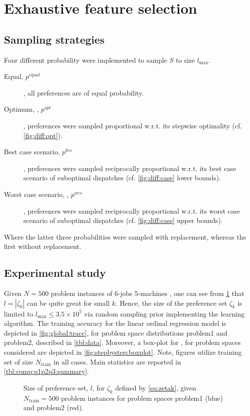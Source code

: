 \section{Exhaustive feature selection}

\subsection{Sampling strategies}
Four different probability were implemented to sample $S$ to size $l_{\max}$. 
\begin{description}
	\item[Equal, $p^{equal}$], all preferences are of equal probability.
	\item[Optimum, , $p^{opt}$], preferences were sampled proportional w.r.t. its stepwise optimality (cf. \cref{fig:diff:opt}).
	\item[Best case scenario, $p^{bcs}$], preferences were sampled reciprocally proportional w.r.t. its best case scenario of suboptimal dispatches (cf. \cref{fig:diff:case} lower bounds).
	\item[Worst case scenario, , $p^{wcs}$], preferences were sampled reciprocally proportional w.r.t. its worst case scenario of suboptimal dispatches (cf. \cref{fig:diff:case} upper bounds).
\end{description}
Where the latter three probabilities were sampled with replacement, whereas the first without replacement.


\subsection{Experimental study}\label{sec:global}
Given $N=500$ problem instances of 6-jobs 5-machines \jsp, one can see from \cref{fig:global:sizeofprefset} that $l=|\zeta_k|$ can be quite great for small $k$. Hence, the size of the preference set $\zeta_k$ is limited to $l_{\max}\leq 3.5\times10^{5}$ via random sampling prior implementing the learning algorithm. The training accuracy for the linear ordinal regression model is depicted in \cref{fig:global:tracc}, for problem space distributions problem{1} and problem{2}, described in \cref{tbl:data}.
Moreover, a box-plot for \fullnamerho, for problem spaces considered are depicted in  \cref{fig:stepbystep:boxplot}. Note, figures utilize training set of size $N_{\text{train}}$ in all cases. Main statistics are reported in \cref{tbl:comp:p1p2p3:summary}. 

\begin{figure}\centering 
\caption{Size of preference set, $l$, for $\zeta_k$ defined by \cref{eq:zetak}, given $N_{\text{train}}=500$ problem instances for problem spaces problem{1} (blue) and problem{2} (red).}
\label{fig:global:sizeofprefset}
\end{figure}

